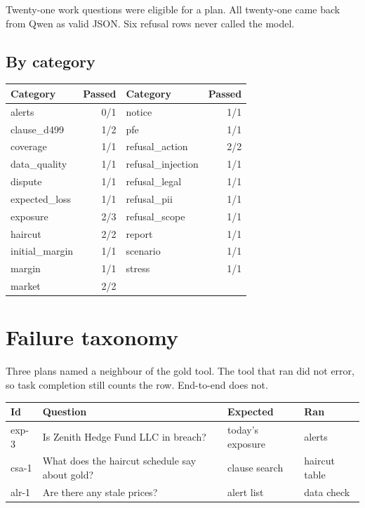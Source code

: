 \documentclass[11pt,a4paper]{article}
\begin{document}
Twenty-one work questions were eligible for a plan. All twenty-one came back from Qwen as valid JSON. Six refusal rows never called the model.

\subsection{By category}

\begin{center}
\begin{tabular}{@{}lr@{\hspace{2em}}lr@{}}
\toprule
Category & Passed & Category & Passed \\
\midrule
alerts & 0/1 & notice & 1/1 \\
clause\_d499 & 1/2 & pfe & 1/1 \\
coverage & 1/1 & refusal\_action & 2/2 \\
data\_quality & 1/1 & refusal\_injection & 1/1 \\
dispute & 1/1 & refusal\_legal & 1/1 \\
expected\_loss & 1/1 & refusal\_pii & 1/1 \\
exposure & 2/3 & refusal\_scope & 1/1 \\
haircut & 2/2 & report & 1/1 \\
initial\_margin & 1/1 & scenario & 1/1 \\
margin & 1/1 & stress & 1/1 \\
market & 2/2 &  &  \\
\bottomrule
\end{tabular}
\end{center}

\section{Failure taxonomy}

Three plans named a neighbour of the gold tool. The tool that ran did not error, so task completion still counts the row. End-to-end does not.

\begin{center}
\small
\begin{tabular}{@{}l>{\raggedright\arraybackslash}p{6.2cm}ll@{}}
\toprule
Id & Question & Expected & Ran \\
\midrule
exp-3 & Is Zenith Hedge Fund LLC in breach? & today's exposure & alerts \\
csa-1 & What does the haircut schedule say about gold? & clause search & haircut table \\
alr-1 & Are there any stale prices? & alert list & data check \\
\bottomrule
\end{tabular}
\end{center}
\end{document}
